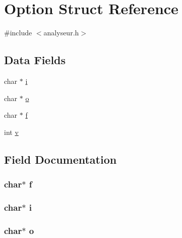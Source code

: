 \hypertarget{struct_option}{}\section{Option Struct Reference}
\label{struct_option}


{\ttfamily \#include $<$analyseur.\+h$>$}

\subsection*{Data Fields}
\begin{DoxyCompactItemize}
\item 
char $\ast$ \hyperlink{struct_option_ab689c4ee257fccedce9922cb016c2e70}{i}
\item 
char $\ast$ \hyperlink{struct_option_ad736f700c72ff136cfb55439d8a11c7f}{o}
\item 
char $\ast$ \hyperlink{struct_option_ac2dd92a6e3aa88e63c9b7680aec3b02b}{f}
\item 
int \hyperlink{struct_option_ac8859e8c1ce357c4c8b37bbb1936ba1c}{v}
\end{DoxyCompactItemize}


\subsection{Field Documentation}
\subsubsection[{\texorpdfstring{f}{f}}]{\setlength{\rightskip}{0pt plus 5cm}char$\ast$ f}\hypertarget{struct_option_ac2dd92a6e3aa88e63c9b7680aec3b02b}{}\label{struct_option_ac2dd92a6e3aa88e63c9b7680aec3b02b}
\subsubsection[{\texorpdfstring{i}{i}}]{\setlength{\rightskip}{0pt plus 5cm}char$\ast$ i}\hypertarget{struct_option_ab689c4ee257fccedce9922cb016c2e70}{}\label{struct_option_ab689c4ee257fccedce9922cb016c2e70}
\subsubsection[{\texorpdfstring{o}{o}}]{\setlength{\rightskip}{0pt plus 5cm}char$\ast$ o}\hypertarget{struct_option_ad736f700c72ff136cfb55439d8a11c7f}{}\label{struct_option_ad736f700c72ff136cfb55439d8a11c7f}
